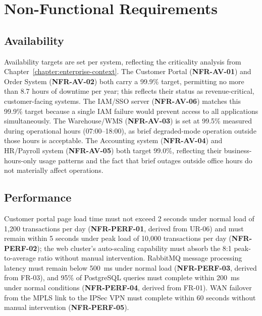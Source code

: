 \section{Non-Functional Requirements}

\subsection{Availability}

\label{tab:req-availability}Availability targets are set per system, reflecting the criticality analysis from Chapter~\ref{chapter:enterprise-context}. The Customer Portal (\textbf{NFR-AV-01}) and Order System (\textbf{NFR-AV-02}) both carry a 99.9\% target, permitting no more than 8.7 hours of downtime per year; this reflects their status as revenue-critical, customer-facing systems. The IAM/SSO server (\textbf{NFR-AV-06}) matches this 99.9\% target because a single IAM failure would prevent access to all applications simultaneously. The Warehouse/WMS (\textbf{NFR-AV-03}) is set at 99.5\% measured during operational hours (07:00--18:00), as brief degraded-mode operation outside those hours is acceptable. The Accounting system (\textbf{NFR-AV-04}) and HR/Payroll system (\textbf{NFR-AV-05}) both target 99.0\%, reflecting their business-hours-only usage patterns and the fact that brief outages outside office hours do not materially affect operations.

\subsection{Performance}

Customer portal page load time must not exceed 2 seconds under normal load of 1,200 transactions per day (\textbf{NFR-PERF-01}, derived from UR-06) and must remain within 5 seconds under peak load of 10,000 transactions per day (\textbf{NFR-PERF-02}); the web cluster's auto-scaling capability must absorb the 8:1 peak-to-average ratio without manual intervention. RabbitMQ message processing latency must remain below 500~ms under normal load (\textbf{NFR-PERF-03}, derived from FR-03), and 95\% of PostgreSQL queries must complete within 200~ms under normal conditions (\textbf{NFR-PERF-04}, derived from FR-01). WAN failover from the MPLS link to the IPSec VPN must complete within 60 seconds without manual intervention (\textbf{NFR-PERF-05}).

